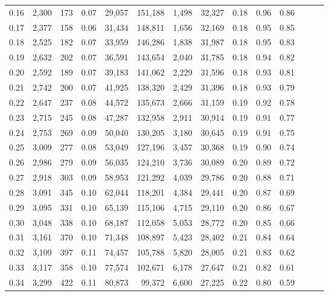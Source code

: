 \begin{tabular}{rrrrrrrrrrrrrr}
0.16 &  2,300 &  173 &  0.07 &   29,057 &  151,188 &   1,498 &  32,327 &  0.18 &  0.96 &      0.86 \\
0.17 &  2,377 &  158 &  0.06 &   31,434 &  148,811 &   1,656 &  32,169 &  0.18 &  0.95 &      0.85 \\
0.18 &  2,525 &  182 &  0.07 &   33,959 &  146,286 &   1,838 &  31,987 &  0.18 &  0.95 &      0.83 \\
0.19 &  2,632 &  202 &  0.07 &   36,591 &  143,654 &   2,040 &  31,785 &  0.18 &  0.94 &      0.82 \\
0.20 &  2,592 &  189 &  0.07 &   39,183 &  141,062 &   2,229 &  31,596 &  0.18 &  0.93 &      0.81 \\
0.21 &  2,742 &  200 &  0.07 &   41,925 &  138,320 &   2,429 &  31,396 &  0.18 &  0.93 &      0.79 \\
0.22 &  2,647 &  237 &  0.08 &   44,572 &  135,673 &   2,666 &  31,159 &  0.19 &  0.92 &      0.78 \\
0.23 &  2,715 &  245 &  0.08 &   47,287 &  132,958 &   2,911 &  30,914 &  0.19 &  0.91 &      0.77 \\
0.24 &  2,753 &  269 &  0.09 &   50,040 &  130,205 &   3,180 &  30,645 &  0.19 &  0.91 &      0.75 \\
0.25 &  3,009 &  277 &  0.08 &   53,049 &  127,196 &   3,457 &  30,368 &  0.19 &  0.90 &      0.74 \\
0.26 &  2,986 &  279 &  0.09 &   56,035 &  124,210 &   3,736 &  30,089 &  0.20 &  0.89 &      0.72 \\
0.27 &  2,918 &  303 &  0.09 &   58,953 &  121,292 &   4,039 &  29,786 &  0.20 &  0.88 &      0.71 \\
0.28 &  3,091 &  345 &  0.10 &   62,044 &  118,201 &   4,384 &  29,441 &  0.20 &  0.87 &      0.69 \\
0.29 &  3,095 &  331 &  0.10 &   65,139 &  115,106 &   4,715 &  29,110 &  0.20 &  0.86 &      0.67 \\
0.30 &  3,048 &  338 &  0.10 &   68,187 &  112,058 &   5,053 &  28,772 &  0.20 &  0.85 &      0.66 \\
0.31 &  3,161 &  370 &  0.10 &   71,348 &  108,897 &   5,423 &  28,402 &  0.21 &  0.84 &      0.64 \\
0.32 &  3,109 &  397 &  0.11 &   74,457 &  105,788 &   5,820 &  28,005 &  0.21 &  0.83 &      0.62 \\
0.33 &  3,117 &  358 &  0.10 &   77,574 &  102,671 &   6,178 &  27,647 &  0.21 &  0.82 &      0.61 \\
0.34 &  3,299 &  422 &  0.11 &   80,873 &   99,372 &   6,600 &  27,225 &  0.22 &  0.80 &      0.59 \\

\end{tabular}
